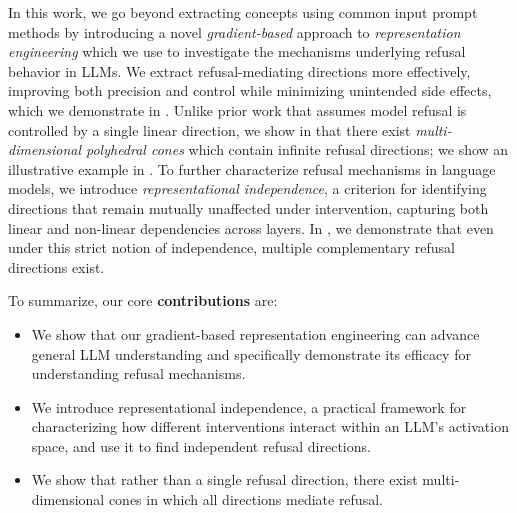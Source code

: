 In this work, we go beyond extracting concepts using common input prompt methods by introducing a novel \textit{gradient-based} approach to \textit{representation engineering} which we use to investigate the mechanisms underlying refusal behavior in LLMs. We extract refusal-mediating directions more effectively, improving both precision and control while minimizing unintended side effects, which we demonstrate in . Unlike prior work that assumes model refusal is controlled by a single linear direction, we show in  that there exist \emph{multi-dimensional polyhedral cones} which contain infinite refusal directions; we show an illustrative example in . To further characterize refusal mechanisms in language models, we introduce \emph{representational independence}, a criterion for identifying directions that remain mutually unaffected under intervention, capturing both linear and non-linear dependencies across layers. In , we demonstrate that even under this strict notion of independence, multiple complementary refusal directions exist.

To summarize, our core \textbf{contributions} are:\vspace{-0.19in}
\begin{itemize}
\itemsep-0.5em 
    \item We show that our gradient-based representation engineering can advance general LLM understanding and specifically demonstrate its efficacy for understanding refusal mechanisms.
    \item We introduce representational independence, a practical framework for characterizing how different interventions interact within an LLM’s activation space, and use it to find independent refusal directions.
    \item We show that rather than a single refusal direction, there exist multi-dimensional cones in which all directions mediate refusal.
\end{itemize}

